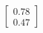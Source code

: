 \documentclass[preview]{standalone}
\begin{document}
\begin{align*}
\begin{bmatrix} 0.78 \\ 0.47 \end{bmatrix}
\end{align*}
\end{document}
